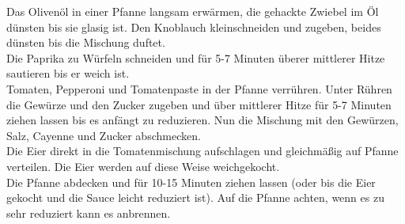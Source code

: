 \vspace*{\fill}
\begin{multicols}{2}


Das Olivenöl in einer Pfanne langsam erwärmen, die gehackte Zwiebel im Öl dünsten bis sie glasig ist.
Den Knoblauch kleinschneiden und zugeben, beides dünsten bis die Mischung duftet.\\


Die Paprika zu Würfeln schneiden und für 5-7 Minuten überer mittlerer Hitze sautieren bis er weich ist.\\

Tomaten, Pepperoni und Tomatenpaste in der Pfanne verrühren.
Unter Rühren die Gewürze und den Zucker zugeben und über mittlerer Hitze 
für 5-7  Minuten ziehen lassen bis es anfängt zu reduzieren.
Nun die Mischung mit den Gewürzen, Salz, Cayenne und Zucker abschmecken.\\


Die Eier direkt in die Tomatenmischung aufschlagen und gleichmäßig 
auf Pfanne verteilen.
Die Eier werden auf diese Weise weichgekocht. \\


Die Pfanne abdecken und für 10-15 Minuten ziehen lassen
(oder bis die Eier gekocht und die Sauce leicht reduziert ist).
Auf die Pfanne achten, wenn es zu sehr reduziert kann es anbrennen.\\



\end{multicols}
